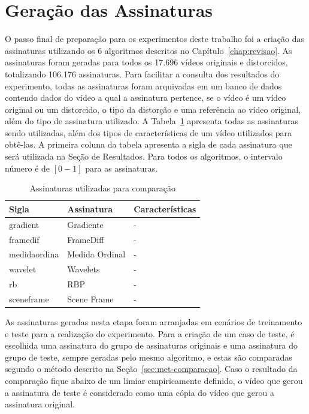 \section{Geração das Assinaturas}
\label{sec:met-assinaturas}

O passo final de preparação para os experimentos deste trabalho foi a criação das assinaturas utilizando os 6 algoritmos descritos no Capítulo~\ref{chap:revisao}. As assinaturas foram geradas para todos os 17.696 vídeos originais e distorcidos, totalizando 106.176 assinaturas. Para facilitar a consulta dos resultados do experimento, todas as assinaturas foram arquivadas em um banco de dados contendo dados do vídeo a qual a assinatura pertence, se o vídeo é um vídeo original ou um distorcido, o tipo da distorção e uma referência ao vídeo original, além do tipo de assinatura utilizado. A Tabela~\ref{tab:assinaturas} apresenta todas as assinaturas sendo utilizadas, além dos tipos de características de um vídeo utilizados para obtê-las. A primeira coluna da tabela apresenta a sigla de cada assinatura que será utilizada na Seção de Resultados. Para todos os algoritmos, o intervalo número é de $[0 - 1]$ para as assinaturas.


\begin{table}[h]
    \centering
    \caption{Assinaturas utilizadas para comparação}
    \label{tab:assinaturas}
    \begin{tabular}{|p{}|p{}|p{}|} \hline
        \textbf{Sigla} & \textbf{Assinatura} & \textbf{Características} \\ \hline
        gradient & Gradiente & - \\ \hline
        framedif & FrameDiff & - \\ \hline
        medidaordina & Medida Ordinal & - \\ \hline
        wavelet & Wavelets & - \\ \hline
        rb & RBP & - \\ \hline
        sceneframe & Scene Frame & - \\ \hline
    \end{tabular}
\end{table}

As assinaturas geradas nesta etapa foram arranjadas em cenários de treinamento e teste para a realização do experimento. Para a criação de um caso de teste, é escolhida uma assinatura do grupo de assinaturas originais e uma assinatura do grupo de teste, sempre geradas pelo mesmo algoritmo, e estas são comparadas segundo o método descrito na Seção~\ref{sec:met-comparacao}. Caso o resultado da comparação fique abaixo de um limiar empiricamente definido, o vídeo que gerou a assinatura de teste é considerado como uma cópia do vídeo que gerou a assinatura original.

